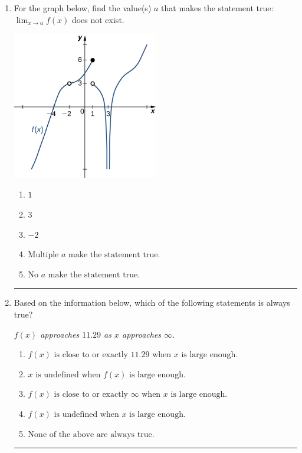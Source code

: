 \documentclass[14pt]{extbook}
\newcommand{\litem}[1]{\item#1\hspace*{-1cm}\rule{\textwidth}{0.4pt}}
\begin{document}
\begin{enumerate}
{\begin{enumerate}[label=\Alph*.]
\end{enumerate} }
\litem{
For the graph below, find the value(s) $a$ that makes the statement true: $ \displaystyle \lim_{x \rightarrow a} f(x)$ does not exist.
\begin{center}
    \includegraphics[width=0.5\textwidth]{../Figures/evaluateLimitGraphicallyCopyA.png}
\end{center}
\begin{enumerate}[label=\Alph*.]
\item \( 1 \)
\item \( 3 \)
\item \( -2 \)
\item \( \text{Multiple } a \text{ make the statement true}. \)
\item \( \text{No } a \text{ make the statement true}. \)

\end{enumerate} }
\litem{
Based on the information below, which of the following statements is always true?
\begin{center}
    \textit{ $f(x)$ approaches $11.29$ as $x$ approaches $\infty$. }
\end{center}
\begin{enumerate}[label=\Alph*.]
\item \( f(x) \text{ is close to or exactly } 11.29 \text{ when } x \text{ is large enough}. \)
\item \( x \text{ is undefined when } f(x) \text{ is large enough}. \)
\item \( f(x) \text{ is close to or exactly } \infty \text{ when } x \text{ is large enough}. \)
\item \( f(x) \text{ is undefined when } x \text{ is large enough}. \)
\item \( \text{None of the above are always true.} \)


\end{enumerate}}
\end{enumerate}
\end{document}
